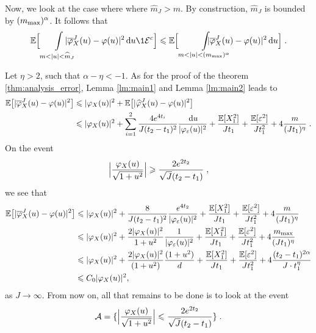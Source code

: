 Now, we look at the case where where $\hat m_J > m$. By construction, $\hat m_J$ is bounded by $(m_{\max})^\alpha$. It follows that 
    \begin{equation*}
        \EE \Big[ \int\limits_{m < |u| < \hat m_J }\hspace{-15pt} |\bar \varphi_X^J(u) - \varphi(u)|^2 \du \1{\Ecal^c} \Big] 
        \leq
        \EE \Big[ \int\limits_{m < |u| < (\mmax)^\alpha }\hspace{-30pt} |\bar \varphi_X^J(u) - \varphi(u)|^2 \du \Big]
        \eqfinp
    \end{equation*}

Let $\eta > 2$, such that $\alpha - \eta < -1$.
As for the proof of the theorem \ref{thm:analysis_error}, Lemma \ref{lm:main1} and Lemma \ref{lm:main2} leads to 
    \begin{align*}
         \mathbb{E} \big[ |\overline \varphi_X^J(u) - \varphi(u)|^2 \big]
         &
        \leqslant |\varphi_X(u)|^2 +
        \mathbb{E} \big[ |\widehat \varphi_X^J(u) - \varphi(u)|^2 \big]
         \\
         &
         \leqslant |\varphi_X(u)|^2 
         +
        \sum_{i = 1}^2 \frac{4 e^{4t_i}}{J (t_2 - t_1)^2} \frac{\, \mathrm du}{|\varphi_{\varepsilon}(u)|^2}
         + 
         \frac{\mathbb{E}[X_1^2]}{J t_1} + \frac{ \mathbb{E}[\varepsilon^2]}{J t_1^2} + 4 \frac{m}{(J t_1)^\eta} 
         \; .
    \end{align*}   
On the event $$  \Big|\frac{ \varphi_X(u)}{\sqrt{1 + u^2}}  \Big| \geqslant \frac{2e^{2 t_2}}{\sqrt{J}(t_2 - t_1)}\; ,$$ we see that 
        \begin{align*}
         \mathbb{E} \big[ |\overline \varphi_X^J(u) - \varphi(u)|^2 \big]
         &\leqslant|\varphi_X(u)|^2 + \frac{8}{J(t_2 - t_1)^2}\frac{e^{4t_2}}{|\varphi_\varepsilon(u)|^2}
         + 
         \frac{\mathbb{E}[X_1^2]}{J t_1} + \frac{ \mathbb{E}[\varepsilon^2]}{J t_1^2} + 4 \frac{m}{(J t_1)^\eta} \\
        &\leqslant |\varphi_X(u)|^2 +  \frac{2 |\varphi_X(u)|^2}{1 + u^{2}}  \frac{1}{|\varphi_\varepsilon(u)|^2}
         + 
         \frac{\mathbb{E}[X_1^2]}{J t_1} + \frac{ \mathbb{E}[\varepsilon^2]}{J t_1^2} + 4 \frac{m_{\max}}{(J t_1)^\eta} \\
         &
         \leqslant |\varphi_X(u)|^2 +  \frac{2 |\varphi_X(u)|^2}{(1 + u^{2})} \frac{(1+u^2)}{d}
         + 
         \frac{\mathbb{E}[X_1^2]}{J t_1} + \frac{ \mathbb{E}[\varepsilon^2]}{J t_1^2} + 4 \frac{(t_2 - t_1)^{2\alpha}}{J \cdot t_1^\eta} \\
         &\leqslant C_0 |\varphi_X(u)|^2,
    \end{align*}
as $J \to \infty$. 
From now on, all that remains to be done is to look at the event $$\mathcal{A} = \{ \Big|\frac{ \varphi_X(u)}{\sqrt{1 + u^2}}  \Big| \leqslant \frac{2e^{2 t_2}}{\sqrt{J}(t_2 - t_1)} \}\; .$$
